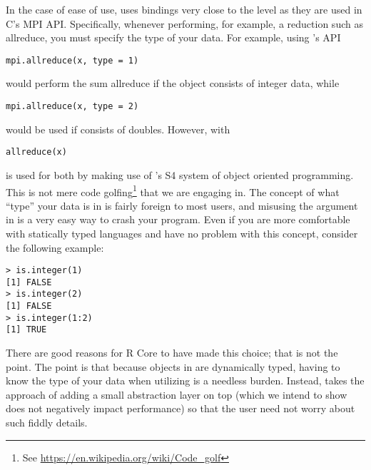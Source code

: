 In the case of ease of use,  uses bindings very close to the level as they are used in C's MPI API.  Specifically, whenever performing, for example, a reduction such as allreduce, you must specify the type of your data.  For example, using 's API
\begin{lstlisting}[language=rr]
mpi.allreduce(x, type = 1)
\end{lstlisting}
would perform the sum allreduce if the object  consists of integer data, while
\begin{lstlisting}[language=rr]
mpi.allreduce(x, type = 2)
\end{lstlisting}
would be used if  consists of doubles.  However, with 
\begin{lstlisting}[language=rr]
allreduce(x)
\end{lstlisting}
is used for both by making use of 's S4 system of object oriented programming.  This is not mere code golfing\footnote{See \url{https://en.wikipedia.org/wiki/Code_golf}} that we are engaging in.  The concept of what ``type'' your data is in  is fairly foreign to most  users, and misusing the  argument in  is a very easy way to crash your program.  Even if you are more comfortable with statically typed languages and have no problem with this concept, consider the following example:

\begin{lstlisting}[language=rr,title=Types in R]
> is.integer(1)
[1] FALSE
> is.integer(2)
[1] FALSE
> is.integer(1:2)
[1] TRUE
\end{lstlisting}

There are good reasons for R Core to have made this choice; that is not the point.  The point is that because objects in  are dynamically typed, having to know the type of your data when utilizing  is a needless burden.  Instead,  takes the approach of adding a small abstraction layer on top (which we intend to show does not negatively impact performance) so that the user need not worry about such fiddly details.


